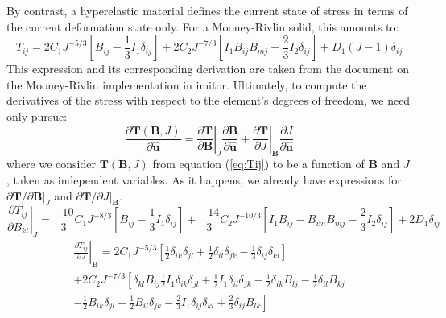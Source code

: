 \documentclass[11pt]{article} %
\begin{document}
By contrast, a hyperelastic material defines the current state of stress in terms of the current deformation state only. For a Mooney-Rivlin solid, this amounts to:
\begin{equation}
	T_{ij} = 2 C_1 J^{-5/3} \left[ B_{ij} - \frac{1}{3} I_1 \delta_{ij} \right] + 2 C_2 J^{-7/3} \left[ I_1 B_{ij} B_{mj} - \frac{2}{3} I_2 \delta_{ij} \right] + D_1 (J-1) \delta_{ij}
	\label{eq:Tij}
\end{equation}
This expression and its corresponding derivation are taken from the document on the Mooney-Rivlin implementation in imitor. Ultimately, to compute the derivatives of the stress with respect to the element's degrees of freedom, we need only pursue:
\begin{equation}
	\frac{\partial \mathbf{T} (\mathbf{B}, J)}{\partial \hat{\mathbf{u}}} = \left. \frac{\partial \mathbf{T}}{\partial {\mathbf{B}}} \right|_{J} \frac{\partial {\mathbf{B}}}{\partial \hat{\mathbf{u}}} + \left. \frac{\partial \mathbf{T}}{\partial {J}} \right|_{\mathbf{B}} \frac{\partial {J}}{\partial \hat{\mathbf{u}}}
\end{equation}
where we consider $\mathbf{T} (\mathbf{B}, J)$ from equation (\ref{eq:Tij}) to be a function of $\mathbf{B}$ and $J$, taken as independent variables. As it happens, we already have expressions for $\left. {\partial \mathbf{T}}/{\partial {\mathbf{B}}} \right|_{J}$ and $\left. {\partial \mathbf{T}}/{\partial {J}} \right|_{\mathbf{B}}$.
\begin{equation}
	\left. \frac{\partial T_{ij}}{\partial B_{kl}} \right|_{J} = \frac{-10}{3} C_1 J^{-8/3} \left[ B_{ij} - \frac{1}{3} I_1 \delta_{ij} \right] + \frac{-14}{3} C_2 J^{-10/3} \left[ I_1 B_{ij} - B_{im} B_{mj} - \frac{2}{3} I_2 \delta_{ij} \right] + 2 D_1 \delta_{ij}
\end{equation}
\begin{eqnarray}
	\left. \frac{\partial T_{ij}}{\partial J} \right|_{\mathbf{B}} = 2 C_1 J^{-5/3} \left[ \frac{1}{2} \delta_{ik} \delta_{jl} + \frac{1}{2} \delta_{il} \delta_{jk} - \frac{1}{3} \delta_{ij} \delta_{kl} \right] \nonumber \\ + 2 C_2 J^{-7/3} \left[ \delta_{kl} B_{ij} \frac{1}{2} I_1 \delta_{ik} \delta_{jl} + \frac{1}{2} I_1 \delta_{il} \delta_{jk} - \frac{1}{2} \delta_{ik} B_{lj} - \frac{1}{2} \delta_{il} B_{kj} \right. \nonumber \\ \left. - \frac{1}{2} B_{ik} \delta_{jl} - \frac{1}{2} B_{il} \delta_{jk} - \frac{2}{3} I_1 \delta_{ij} \delta_{kl} + \frac{2}{3} \delta_{ij} B_{lk} \right]
\end{eqnarray}
\end{document}
